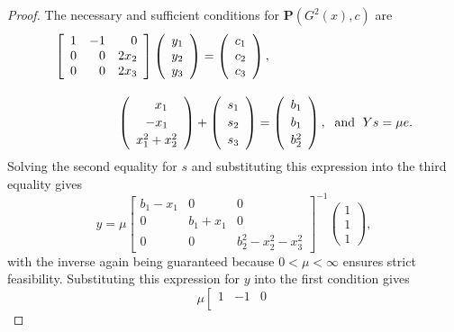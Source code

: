 \documentclass{article}
\def\bP{\mathbf{P}}
\begin{document}
\begin{proof}
The necessary and sufficient conditions for $\bP \left( G^2(x), c \right)$ are
\begin{eqnarray*}
\lefteqn{
\left[ \begin{array}{rrr} 1 & -1 & 0 \\
    0 & 0 & 2x_2 \\ 0 & 0 & 2x_3 \end{array} \right]
    \left( \begin{array}{c} y_1 \\ y_2 \\ y_3 \end{array} \right)
    = \left( \begin{array}{c} c_1 \\ c_2 \\ c_3 \end{array} \right),} \\[10pt]
& & \hspace*{40pt}
    \left( \begin{array}{c} \;\;\,x_1 \\[2pt] -x_1 \\[2pt]
        x_1^2 + x_2^2 \end{array} \right) + 
        \left( \begin{array}{c} s_1 \\[2pt] s_2 \\[2pt] s_3 \end{array} \right) =
        \left( \begin{array}{c} b_1 \\[2pt] b_1 \\[2pt] b_2^2 \end{array} \right), 
        \; \mbox{ and } \;
Ys = \mu e.
\end{eqnarray*}
Solving the second equality for $s$ and substituting this expression into the third equality gives
\[
y = \mu
\left[ \begin{array}{ccc}
    b_1-x_1 & 0 & 0 \\ 0 & b_1+x_1 & 0 \\ 0 & 0 & b_2^2-x_2^2-x_3^2
    \end{array} \right]^{-1} 
    \left( \begin{array}{c} 1 \\ 1 \\ 1 \end{array} \right),
\]
with the inverse again being guaranteed because $0 < \mu < \infty$
ensures strict feasibility. Substituting this expression for $y$
into the first condition gives
\[
\mu \left[ \begin{array}{rrr} 1 & -1 & 0 \\[4pt]

\end{array}\]
\end{proof}
\end{document}
